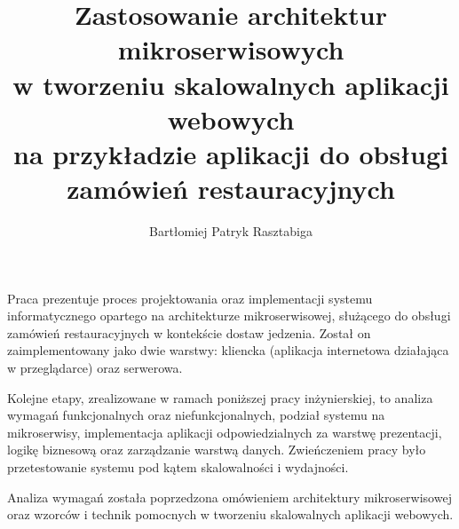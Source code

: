 \documentclass[
    bindingoffset=5mm,  %
    footnoteindent=3mm, %
    hyphenation=true    %
]{src/wut-thesis}
\begin{document}
\title{
    Zastosowanie architektur mikroserwisowych\\
    w tworzeniu skalowalnych aplikacji webowych\\ 
    na przykładzie aplikacji do obsługi zamówień restauracyjnych
}
\author{Bartłomiej Patryk Rasztabiga}
\date{\the\year}
\maketitle

\cleardoublepage %
\abstract

Praca prezentuje proces projektowania oraz implementacji systemu informatycznego opartego na architekturze mikroserwisowej, służącego do obsługi zamówień restauracyjnych w kontekście dostaw jedzenia. Został on zaimplementowany jako dwie warstwy: kliencka (aplikacja internetowa działająca w przeglądarce) oraz serwerowa.

Kolejne etapy, zrealizowane w ramach poniższej pracy inżynierskiej, to analiza wymagań funkcjonalnych oraz niefunkcjonalnych, podział systemu na mikroserwisy, implementacja aplikacji odpowiedzialnych za warstwę prezentacji, logikę biznesową oraz zarządzanie warstwą danych. Zwieńczeniem pracy było przetestowanie systemu pod kątem skalowalności i wydajności.

Analiza wymagań została poprzedzona omówieniem architektury mikroserwisowej oraz wzorców i technik pomocnych w tworzeniu skalowalnych aplikacji webowych.
\end{document}
